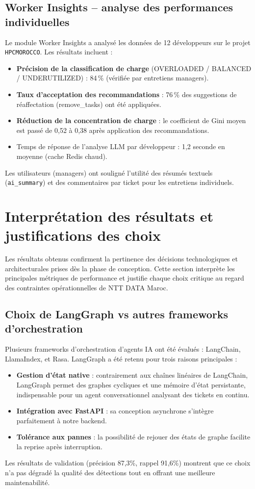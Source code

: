 \subsection{Worker Insights – analyse des performances individuelles}
Le module Worker Insights a analysé les données de 12 développeurs sur le projet \texttt{HPCMOROCCO}. Les résultats incluent :
\begin{itemize}
    \renewcommand{\labelitemi}{—}
    \item \textbf{Précision de la classification de charge} (OVERLOADED / BALANCED / UNDERUTILIZED) : 84\,\% (vérifiée par entretiens managers).
    \item \textbf{Taux d’acceptation des recommandations} : 76\,\% des suggestions de réaffectation (remove\_tasks) ont été appliquées.
    \item \textbf{Réduction de la concentration de charge} : le coefficient de Gini moyen est passé de 0,52 à 0,38 après application des recommandations.
    \item Temps de réponse de l’analyse LLM par développeur : 1,2 seconde en moyenne (cache Redis chaud).
\end{itemize}
Les utilisateurs (managers) ont souligné l’utilité des résumés textuels (\texttt{ai\_summary}) et des commentaires par ticket pour les entretiens individuels.


\section{Interprétation des résultats et justifications des choix}
Les résultats obtenus confirment la pertinence des décisions technologiques et architecturales prises dès la phase de conception. Cette section interprète les principales métriques de performance et justifie chaque choix critique au regard des contraintes opérationnelles de NTT DATA Maroc.

\subsection{Choix de LangGraph vs autres frameworks d’orchestration}
Plusieurs frameworks d’orchestration d’agents IA ont été évalués : LangChain, LlamaIndex, et Rasa. LangGraph a été retenu pour trois raisons principales :
\begin{itemize}
    \renewcommand{\labelitemi}{—}
    \item \textbf{Gestion d’état native} : contrairement aux chaînes linéaires de LangChain, LangGraph permet des graphes cycliques et une mémoire d’état persistante, indispensable pour un agent conversationnel analysant des tickets en continu.
    \item \textbf{Intégration avec FastAPI} : sa conception asynchrone s’intègre parfaitement à notre backend.
    \item \textbf{Tolérance aux pannes} : la possibilité de rejouer des états de graphe facilite la reprise après interruption.
\end{itemize}
Les résultats de validation (précision 87,3\%, rappel 91,6\%) montrent que ce choix n’a pas dégradé la qualité des détections tout en offrant une meilleure maintenabilité.

